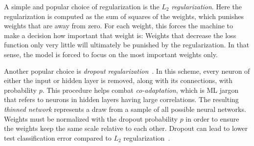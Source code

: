 A simple and popular choice of regularization is the $L_2$ 
{\it regularization}. Here the regularization is computed as
the sum of squares of the weights, which punishes weights that are away from
zero. For each weight, this forces the machine to make a decision how important
that weight is: Weights that decrease the loss function only very little will
ultimately be punished by the regularization. In that sense, the model is forced
to focus on the most important weights only.

Another popular choice is {\it dropout
regularization}~\cite{srivastava_dropout_2014}. In this scheme, every neuron of
either the input or hidden layer is removed, along with its connections, with
probability $p$. This procedure helps combat {\it
co-adaptation}, which is ML jargon that refers to neurons
in hidden layers having large correlations. The 
resulting {\it thinned network}
represents a draw from a sample of all possible neural networks. Weights must be
normalized with the dropout probability $p$ in order to ensure the weights keep
the same scale relative to each other. Dropout can lead to lower test classification 
error compared to $L_2$ regularization~\cite{srivastava_dropout_2014}.




